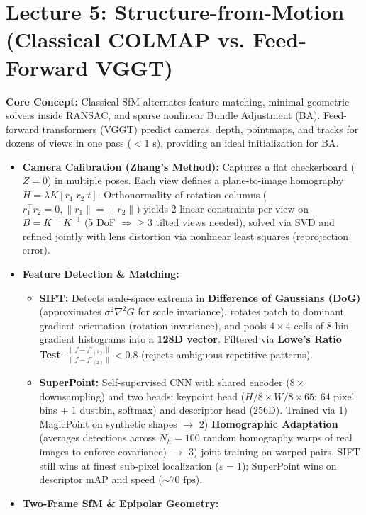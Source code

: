 \documentclass[11pt,a4paper]{article}
\theoremstyle{definition}
\theoremstyle{plain}
\theoremstyle{remark}
\begin{document}
\hr
\section*{\textcolor{primary}{Lecture 5: Structure-from-Motion (Classical COLMAP vs. Feed-Forward VGGT)}}
\textbf{Core Concept:} Classical SfM alternates feature matching, minimal geometric solvers inside RANSAC, and sparse nonlinear Bundle Adjustment (BA). Feed-forward transformers (VGGT) predict cameras, depth, pointmaps, and tracks for dozens of views in one pass ($<1\text{ s}$), providing an ideal initialization for BA.

\begin{itemize}
    \item \textbf{Camera Calibration (Zhang's Method):} Captures a flat checkerboard ($Z=0$) in multiple poses. Each view defines a plane-to-image homography $H = \lambda K [r_1\; r_2\; t]$. Orthonormality of rotation columns ($r_1^\top r_2 = 0, \|r_1\|=\|r_2\|$) yields 2 linear constraints per view on $B = K^{-\top}K^{-1}$ (5 DoF $\Rightarrow \ge 3$ tilted views needed), solved via SVD and refined jointly with lens distortion via nonlinear least squares (reprojection error).
    \item \textbf{Feature Detection \& Matching:}
    \begin{itemize}
        \item \textbf{SIFT:} Detects scale-space extrema in \textbf{Difference of Gaussians (DoG)} (approximates $\sigma^2\nabla^2 G$ for scale invariance), rotates patch to dominant gradient orientation (rotation invariance), and pools $4\times 4$ cells of 8-bin gradient histograms into a \textbf{128D vector}. Filtered via \textbf{Lowe's Ratio Test}: $\frac{\|f - f'_{(1)}\|}{\|f - f'_{(2)}\|} < 0.8$ (rejects ambiguous repetitive patterns).
        \item \textbf{SuperPoint:} Self-supervised CNN with shared encoder ($8\times$ downsampling) and two heads: keypoint head ($H/8 \times W/8 \times 65$: 64 pixel bins + 1 dustbin, softmax) and descriptor head ($256\text{D}$). Trained via 1) MagicPoint on synthetic shapes $\rightarrow$ 2) \textbf{Homographic Adaptation} (averages detections across $N_h=100$ random homography warps of real images to enforce covariance) $\rightarrow$ 3) joint training on warped pairs. SIFT still wins at finest sub-pixel localization ($\varepsilon=1$); SuperPoint wins on descriptor mAP and speed ($\sim 70\text{ fps}$).
    \end{itemize}
    \item \textbf{Two-Frame SfM \& Epipolar Geometry:}

\end{itemize}
\end{document}
